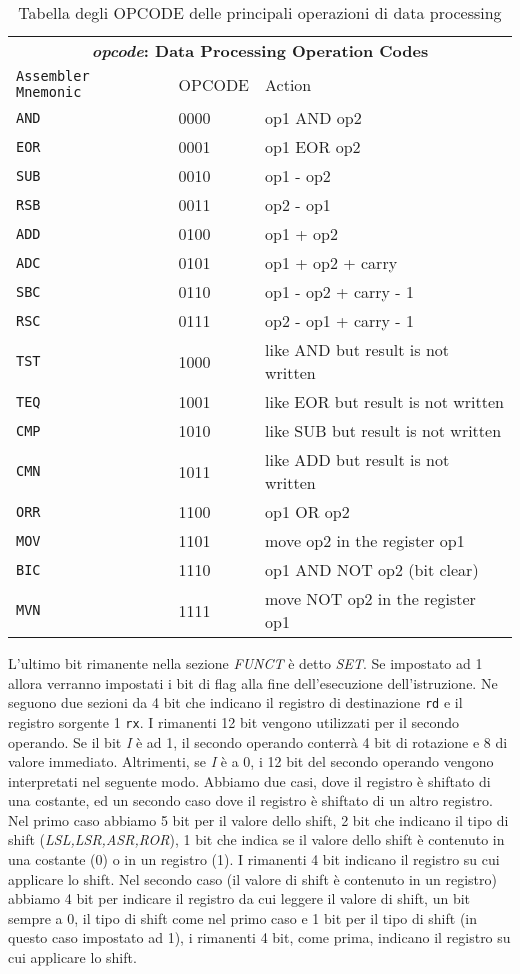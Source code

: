 \begin{defn}
    \def\opcode#1#2#3{\texttt{#1} & \small #2 & #3\\}
    \begin{table}[H]
	\centering
	\caption{Tabella degli OPCODE delle principali operazioni di data processing}
	\label{tab:opcodes}
	\begin{tabular}{l@{\hspace{5mm}}ll}
	\multicolumn{3}{c}{\bfseries \emph{opcode}: Data Processing Operation Codes } \\
	\opcode{Assembler Mnemonic}{OPCODE}{Action}
	\hline
    \opcode{AND}{0000}{op1 AND op2}
    \opcode{EOR}{0001}{op1 EOR op2}
    \opcode{SUB}{0010}{op1 - op2}
    \opcode{RSB}{0011}{op2 - op1}
    \opcode{ADD}{0100}{op1 + op2}
    \opcode{ADC}{0101}{op1 + op2 + carry}
    \opcode{SBC}{0110}{op1 - op2 + carry - 1}
    \opcode{RSC}{0111}{op2 - op1 + carry - 1}
    \opcode{TST}{1000}{like AND but result is not written}
    \opcode{TEQ}{1001}{like EOR but result is not written}
    \opcode{CMP}{1010}{like SUB but result is not written}
    \opcode{CMN}{1011}{like ADD but result is not written}
    \opcode{ORR}{1100}{op1 OR op2}
    \opcode{MOV}{1101}{move op2 in the register op1}
    \opcode{BIC}{1110}{op1 AND NOT op2 (bit clear)}
    \opcode{MVN}{1111}{move NOT op2 in the register op1}
    \hline
    \end{tabular}
    \end{table}
    L'ultimo bit rimanente nella sezione \textit{FUNCT} è detto \textit{SET}. Se impostato ad 1 allora verranno impostati i bit di flag alla fine dell'esecuzione dell'istruzione.
    Ne seguono due sezioni da 4 bit che indicano il registro di destinazione \verb|rd| e
    il registro sorgente 1 \verb|rx|.
    I rimanenti 12 bit vengono utilizzati per il secondo operando.
    Se il bit \textit{I} è ad 1, il secondo operando conterrà 4 bit di rotazione e 8 di valore immediato.
    Altrimenti, se \textit{I} è a 0, i 12 bit del secondo operando vengono interpretati nel seguente modo.
    Abbiamo due casi, dove il registro è shiftato di una costante, ed un secondo caso dove il registro è shiftato di
    un altro registro. Nel primo caso abbiamo 5 bit per il valore dello shift, 2 bit che indicano il tipo di shift (\textit{LSL,LSR,ASR,ROR}), 1 bit che indica se
    il valore dello shift è contenuto in una costante (0) o in un registro (1). I rimanenti 4 bit indicano il registro su cui applicare lo shift.
    Nel secondo caso (il valore di shift è contenuto in un registro) abbiamo 4 bit per indicare il registro da cui leggere il valore di shift, un bit sempre a 0,
    il tipo di shift come nel primo caso e 1 bit per il tipo di shift (in questo caso impostato ad 1), i rimanenti 4 bit, come prima, indicano il registro su cui applicare lo shift.

\end{defn}


